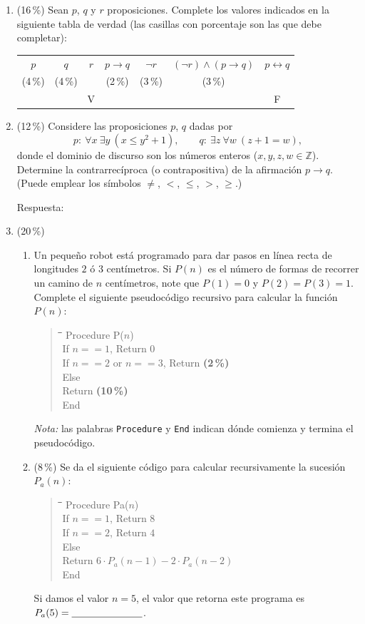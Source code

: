 \documentclass[11pt]{article}
\newcommand{\resp}{\underline{\hspace{2.5cm}}}
\newcommand{\resplong}{\underline{\hspace{9cm}}}
\newenvironment{pseudo}{%
  \begin{quote}\ttfamily\small\begin{tabbing}
  \hspace{2em}\=\hspace{2em}\=\hspace{2em}\=\hspace{2em}\=\kill}{%
  \end{tabbing}\end{quote}}
\begin{document}
\begin{enumerate}
\item (16\,\%) Sean $p$, $q$ y $r$ proposiciones. Complete los valores indicados en la siguiente tabla de verdad (las casillas con porcentaje son las que debe completar):
\begin{center}
\begin{tabular}{|c|c|c|c|c|c|c|}
\hline
$p$ & $q$ & $r$ & $p \to q$ & $\neg r$ & $(\neg r) \wedge (p \to q)$ & $p \leftrightarrow q$ \\
\small(4\,\%) & \small(4\,\%) & & \small(2\,\%) & \small(3\,\%) & \small(3\,\%) & \\
\hline
 & & V & & & & F \\
\hline
\end{tabular}
\end{center}

\item (12\,\%) Considere las proposiciones $p$, $q$ dadas por
\[
p : \ \forall x\ \exists y\ (x \leq y^2 + 1), \qquad
q : \ \exists z\ \forall w\ (z + 1 = w),
\]
donde el dominio de discurso son los números enteros ($x,y,z,w \in \mathbb{Z}$). Determine la contrarrecíproca (o contrapositiva) de la afirmación $p \to q$. (Puede emplear los símbolos $\neq$, $<$, $\leq$, $>$, $\geq$.)

\vspace{4pt}
Respuesta: \resplong

\item (20\,\%)
\begin{enumerate}
\item Un pequeño robot está programado para dar pasos en línea recta de longitudes $2$ ó $3$ centímetros. Si $P(n)$ es el número de formas de recorrer un camino de $n$ centímetros, note que $P(1) = 0$ y $P(2) = P(3) = 1$. Complete el siguiente pseudocódigo recursivo para calcular la función $P(n)$:
\begin{pseudo}
Procedure P($n$)\\
\>If $n == 1$, Return $0$\\
\>If $n == 2$ or $n == 3$, Return \underline{\hspace{2cm}} \quad\textbf{(2\,\%)}\\
\>Else\\
\>\>Return \underline{\hspace{4cm}} \quad\textbf{(10\,\%)}\\
End
\end{pseudo}
\emph{Nota:} las palabras \texttt{Procedure} y \texttt{End} indican dónde comienza y termina el pseudocódigo.
\item (8\,\%) Se da el siguiente código para calcular recursivamente la sucesión $P_a(n)$:
\begin{pseudo}
Procedure Pa($n$)\\
\>If $n == 1$, Return $8$\\
\>If $n == 2$, Return $4$\\
\>Else\\
\>\>Return $6 \cdot P_a(n-1) - 2 \cdot P_a(n-2)$\\
End
\end{pseudo}
Si damos el valor $n = 5$, el valor que retorna este programa es $P_a(5) = \resp$.
\end{enumerate}


\end{enumerate}
\end{document}
